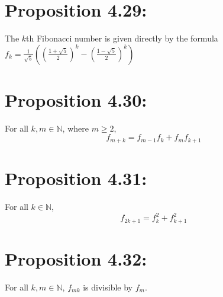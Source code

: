 \section*{Proposition 4.29:}
The $k$th Fibonacci number is given directly by the formula
$f_k = \frac{1}{\sqrt{5}} \left(\left(\frac{1 + \sqrt{5}}{2}\right)^k - \left(\frac{1 - \sqrt{5}}{2}\right)^k\right)$

\section*{Proposition 4.30:}
For all $k,m \in \mathbb{N}$, where $m \geq 2$,
\[ f_{m+k} = f_{m-1} f_k + f_m f_{k+1} \]

\section*{Proposition 4.31:}
For all $k \in \mathbb{N}$,
\[ f_{2k+1} = f_k^2 + f_{k+1}^2 \]

\section*{Proposition 4.32:}
For all $k,m \in \mathbb{N}$, $f_{mk}$ is divisible by $f_m$.
